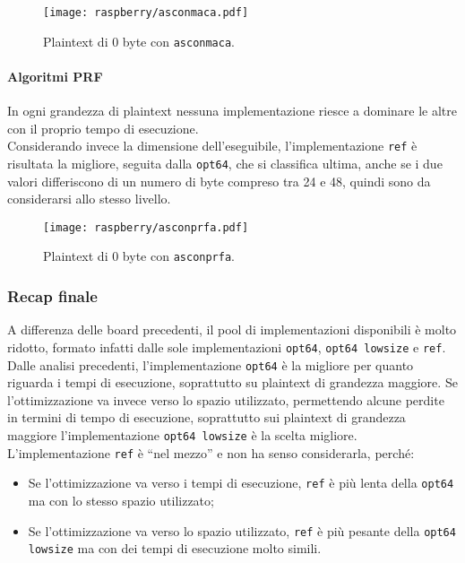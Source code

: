 \begin{figure}[H]
    \centering
    \texttt{[image: raspberry/asconmaca.pdf]}
    \caption{Plaintext di 0 byte con \texttt{asconmaca}.}
\end{figure}

\paragraph{Algoritmi PRF}

In ogni grandezza di plaintext nessuna implementazione riesce a dominare le altre con il proprio tempo di esecuzione. \\

\noindent Considerando invece la dimensione dell'eseguibile, l'implementazione \texttt{ref} è risultata la migliore, seguita dalla \texttt{opt64}, che si classifica ultima, anche se i due valori differiscono di un numero di byte compreso tra 24 e 48, quindi sono da considerarsi allo stesso livello.

\begin{figure}[H]
    \centering
    \texttt{[image: raspberry/asconprfa.pdf]}
    \caption{Plaintext di 0 byte con \texttt{asconprfa}.}
\end{figure}

\subsubsection{Recap finale}

A differenza delle board precedenti, il pool di implementazioni disponibili è molto ridotto, formato infatti dalle sole implementazioni \texttt{opt64}, \texttt{opt64 lowsize} e \texttt{ref}. \\

\noindent Dalle analisi precedenti, l'implementazione \texttt{opt64} è la migliore per quanto riguarda i tempi di esecuzione, soprattutto su plaintext di grandezza maggiore. Se l'ottimizzazione va invece verso lo spazio utilizzato, permettendo alcune perdite in termini di tempo di esecuzione, soprattutto sui plaintext di grandezza maggiore l'implementazione \texttt{opt64 lowsize} è la scelta migliore. L'implementazione \texttt{ref} è ``nel mezzo'' e non ha senso considerarla, perché: \begin{itemize}
    \item Se l'ottimizzazione va verso i tempi di esecuzione, \texttt{ref} è più lenta della \texttt{opt64} ma con lo stesso spazio utilizzato;
    \item Se l'ottimizzazione va verso lo spazio utilizzato, \texttt{ref} è più pesante della \texttt{opt64 lowsize} ma con dei tempi di esecuzione molto simili.
\end{itemize}
